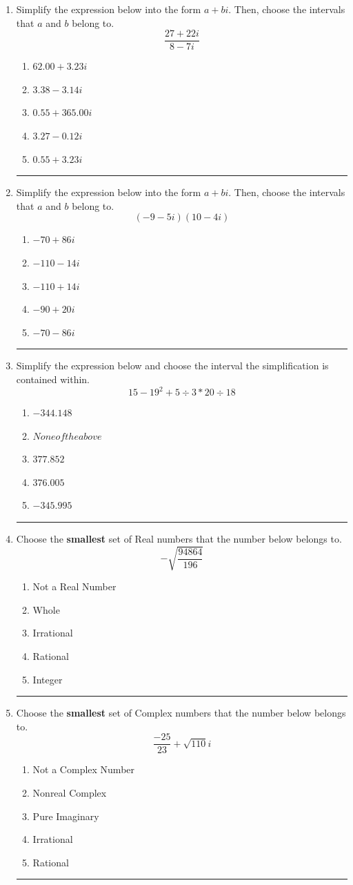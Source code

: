 \documentclass[14pt]{extbook}
\newcommand{\litem}[1]{\item#1\hspace*{-1cm}\rule{\textwidth}{0.4pt}}
\begin{document}
\begin{enumerate}
\litem{
Simplify the expression below into the form $a+bi$. Then, choose the intervals that $a$ and $b$ belong to.\[ \frac{27  + 22 i}{8  - 7 i} \]\begin{enumerate}[label=\Alph*.]
\item \( 62.00  + 3.23 i \)
\item \( 3.38  - 3.14 i \)
\item \( 0.55  + 365.00 i \)
\item \( 3.27  - 0.12 i \)
\item \( 0.55  + 3.23 i \)

\end{enumerate} }
\litem{
Simplify the expression below into the form $a+bi$. Then, choose the intervals that $a$ and $b$ belong to.\[ (-9  - 5 i)(10  - 4 i) \]\begin{enumerate}[label=\Alph*.]
\item \( -70  + 86 i \)
\item \( -110  - 14 i \)
\item \( -110  + 14 i \)
\item \( -90  + 20 i \)
\item \( -70  - 86 i \)

\end{enumerate} }
\litem{
Simplify the expression below and choose the interval the simplification is contained within.\[ 15 - 19^2 + 5 \div 3 * 20 \div 18 \]\begin{enumerate}[label=\Alph*.]
\item \( -344.148 \)
\item \( None of the above \)
\item \( 377.852 \)
\item \( 376.005 \)
\item \( -345.995 \)

\end{enumerate} }
\litem{
Choose the \textbf{smallest} set of Real numbers that the number below belongs to.\[ -\sqrt{\frac{94864}{196}} \]\begin{enumerate}[label=\Alph*.]
\item Not a Real Number
\item Whole
\item Irrational
\item Rational
\item Integer

\end{enumerate} }
\litem{
Choose the \textbf{smallest} set of Complex numbers that the number below belongs to.\[ \frac{-25}{23}+\sqrt{110} i \]\begin{enumerate}[label=\Alph*.]
\item Not a Complex Number
\item Nonreal Complex
\item Pure Imaginary
\item Irrational
\item Rational


\end{enumerate}}
\end{enumerate}
\end{document}
